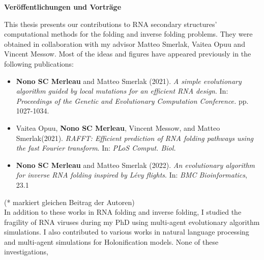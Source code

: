 \begin{center}
{\Large {\bf Ver\"offentlichungen und Vortr\"age}} \vspace{0.5cm}
\end{center}

This thesis presents our contributions to RNA secondary structures' computational methods for the folding and inverse folding problems. They were obtained in collaboration with my advisor Matteo Smerlak, Vaitea Opuu and Vincent Messow. Most of the ideas and figures have appeared previously in the following publications: 

\begin{itemize}

\item \textbf{Nono SC Merleau} and Matteo Smerlak (2021). \emph{A simple evolutionary algorithm guided by local mutations for an efficient RNA design}. In: \textit{Proceedings of the Genetic and Evolutionary Computation Conference.} pp. 1027-1034. %

\item Vaitea Opuu, \textbf{Nono SC Merleau}, Vincent Messow, and Matteo Smerlak(2021). \emph{RAFFT: Efficient prediction of RNA folding pathways using the fast Fourier transform}. In: \textit{PLoS Comput. Biol.}

\item \textbf{Nono SC Merleau}  and Matteo Smerlak (2022). \emph{An evolutionary algorithm for inverse RNA folding inspired by Lévy flights}. In: \textit{BMC Bioinformatics}, 23.1

\end{itemize}
(* markiert gleichen Beitrag der Autoren)\\[.25cm]



In addition to these works in RNA folding and inverse folding, I studied the fragility of RNA viruses during my PhD using multi-agent evolutionary algorithm simulations. I also contributed to various works in natural language processing and multi-agent simulations for Holonification models. 
None of these investigations,


